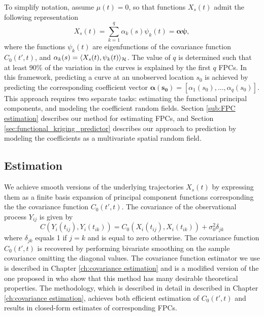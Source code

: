 To simplify notation, assume $\mu(t)=0$, so that functions $X_s(t)$ admit the following representation 
\begin{equation}
	X_{s}(t) = \sum_{k=1}^{q} \alpha_k(s)\psi_k(t) = \boldsymbol{\alpha}\boldsymbol{\psi}, \label{kriging: fpc expansion}
\end{equation}
where the functions $\psi_k(t)$ are eigenfunctions of the covariance function $C_0(t',t)$, and $\alpha_k(s) = \langle X_s(t),  \psi_k(t) \rangle_{\mathcal{H}}$. The value of $q$ is determined such that at least 90\% of the variation in the curves is explained by the first $q$ FPCs. In this framework, predicting a curve at an unobserved location $s_0$ is achieved by predicting the corresponding coefficient vector $\boldsymbol{\alpha(s_0)}=[\alpha_1(s_0), \dots, \alpha_q(s_0)]$. This approach requires two separate tasks: estimating the functional principal components, and modeling the coefficient random fields. Section \ref{sub:FPC estimation} describes our method for estimating FPCs, and Section \ref{sec:functional_kriging_predictor} describes our approach to prediction by modeling the coefficients as a multivariate spatial random field.
\subsection{Estimation} %
\label{sub:estimation}

We achieve smooth versions of the underlying trajectories $X_s(t)$ by expressing them as a finite basis expansion of principal component functions corresponding the the covariance function $C_0(t',t)$. The covariance of the observational process $Y_{ij}$ is given by
\begin{equation}
	C(Y_i(t_{ij}), Y_i(t_{ik})) = C_0(X_i(t_{ij}), X_i(t_{ik})) + \sigma^2_0 \delta_{jk}
\end{equation}
where $\delta_{jk}$ equals 1 if $j=k$ and is equal to zero otherwise. The covariance function $C_0(t',t)$ is recovered by performing bivariate smoothing on the sample covariance omitting the diagonal values.  The covariance function estimator we use is described in Chapter \ref{ch:covariance estimation} and is a modified version of the one proposed in \cite{Cai:2010vr} who show that this method has many desirable theoretical properties. The methodology, which is described in detail in described in Chapter \ref{ch:covariance estimation}, achieves both efficient estimation of $C_0(t',t)$ and results in closed-form estimates of corresponding FPCs.

